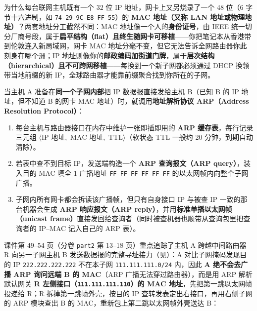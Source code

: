 
为什么每台联网主机既有一个 32 位 IP 地址，网卡上又另烧录了一个 48 位（6 字节十六进制，如 \texttt{74-29-9C-E8-FF-55}）的 \textbf{MAC 地址（又称 LAN 地址或物理地址）}？两套地址分工截然不同：MAC 地址像一个人的\textbf{身份证号}，由 IEEE 统一切分厂商号段，属于\textbf{扁平结构（flat）且终生随网卡可移植}——你把笔记本从香港带到伦敦连入新局域网，网卡 MAC 地址分毫不变，但它无法告诉全网路由器你此刻身在哪个洲；IP 地址则像你的\textbf{邮政编码加街道门牌}，属于\textbf{层次结构（hierarchical）且不可跨网移植}——每换到一个新子网都必须通过 DHCP 换领带当地前缀的新 IP，全球路由器才能靠前缀聚合找到你所在的子网。

当主机 A 准备在\textbf{同一个子网内部}把 IP 数据报直接发给主机 B（已知 B 的 IP 地址，但不知道 B 的网卡 MAC 地址）时，就调用\textbf{地址解析协议 ARP（Address Resolution Protocol）}：
\begin{enumerate}
\item 每台主机与路由器接口在内存中维护一张即插即用的 \textbf{ARP 缓存表}，每行记录三元组 $\langle\text{IP 地址},$ $\text{MAC 地址},$ $\mathrm{TTL}\rangle$（软状态 TTL 一般约 20 分钟，到期自动清除）。
\item 若表中查不到目标 IP，发送端构造一个 \textbf{ARP 查询报文（ARP query）}，装入目的 MAC 填全 1 广播地址 \texttt{FF-FF-FF-FF-FF-FF} 的以太网帧内向整个子网广播。
\item 子网内所有网卡都会拆读该广播帧，但只有自身接口 IP 与被查 IP 一致的那台机器会生成 \textbf{ARP 响应报文（ARP reply）}，并用\textbf{标准单播以太网帧（unicast frame）}直接发回给查询者（同时被查机器也顺带从查询包里把查询者的 IP–MAC 记入自己的 ARP 表）。
\end{enumerate}

课件第 49–54 页（分卷 \texttt{part2} 第 13–18 页）重点追踪了主机 A 跨越中间路由器 R 向另一子网主机 B 发送数据报的完整寻址接力（见）：A 对比子网掩码发现目的 IP \texttt{222.222.222.222} 不在本子网 \texttt{111.111.111.0/24} 内，因此 \textbf{A 绝不会去广播 ARP 询问远端 B 的 MAC}（ARP 广播无法穿过路由器），而是用 ARP 解析默认网关 \textbf{R 左侧接口（\texttt{111.111.111.110}）的 MAC 地址}，先把第一跳以太网帧投递给 R；R 拆掉第一跳帧外壳，按目的 IP 查转发表定出右接口，再用右侧子网的 ARP 模块查出 B 的 MAC，重新包上第二跳以太网帧外壳送达 B：

